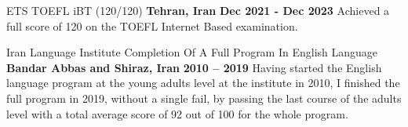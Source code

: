 

\begin{cventries}

   \cventry
    {ETS} %
    {TOEFL iBT (120/120)} %
    {\textbf{Tehran, Iran}} %
    {\textbf{Dec 2021 - Dec 2023}} %
    {
      Achieved a full score of 120 on the TOEFL Internet Based examination.
    }
  
  \cventry
    {Iran Language Institute} %
    {Completion Of A Full Program In English Language} %
    {\textbf{Bandar Abbas and Shiraz, Iran}} %
    {\textbf{2010 – 2019}} %
    {
      Having started the English language program at the young adults level at the institute in 2010, I finished the full program in 2019, without a single fail, by passing the last course of the adults level with a total average score of 92 out of 100 for the whole program.
    }


\end{cventries}

